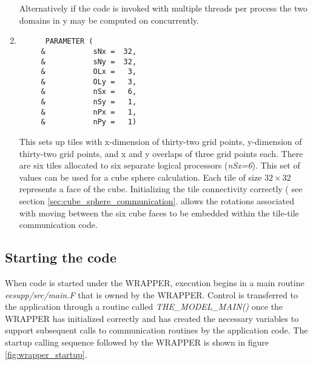 \begin{enumerate}
Alternatively if the code is invoked with multiple threads per process
the two domains in y may be computed on concurrently.
\item
\begin{verbatim}
      PARAMETER (
     &           sNx =  32,
     &           sNy =  32,
     &           OLx =   3,
     &           OLy =   3,
     &           nSx =   6,
     &           nSy =   1,
     &           nPx =   1,
     &           nPy =   1)
\end{verbatim}
This sets up tiles with x-dimension of thirty-two grid points, y-dimension of
thirty-two grid points, and x and y overlaps of three grid points each. 
There are six tiles allocated to six separate logical processors ({\em nSx=6}).
This set of values can be used for a cube sphere calculation.
Each tile of size $32 \times 32$ represents a face of the
cube. Initializing the tile connectivity correctly ( see section
\ref{sec:cube_sphere_communication}. allows the rotations associated with
moving between the six cube faces to be embedded within the 
tile-tile communication code.
\end{enumerate}


\subsection{Starting the code}
\label{sec:starting_the_code}
When code is started under the WRAPPER, execution begins in a main routine {\em
eesupp/src/main.F} that is owned by the WRAPPER. Control is transferred 
to the application through a routine called {\em THE\_MODEL\_MAIN()}
once the WRAPPER has initialized correctly and has created the necessary variables
to support subsequent calls to communication routines
by the application code. The startup calling sequence followed by the 
WRAPPER is shown in figure \ref{fig:wrapper_startup}.

